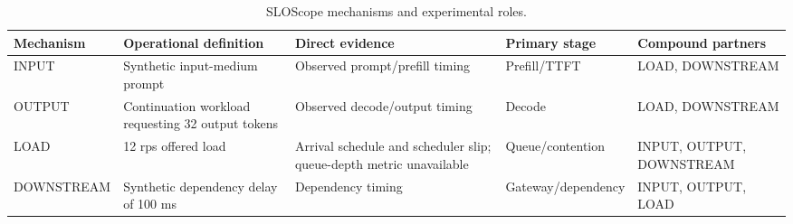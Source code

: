 \begin{table}[t]
\centering
\small
\caption{SLOScope mechanisms and experimental roles.}
\begin{tabular}{lllll}
\hline
Mechanism & Operational definition & Direct evidence & Primary stage & Compound partners \\
\hline
INPUT & Synthetic input-medium prompt & Observed prompt/prefill timing & Prefill/TTFT & LOAD, DOWNSTREAM \\
OUTPUT & Continuation workload requesting 32 output tokens & Observed decode/output timing & Decode & LOAD, DOWNSTREAM \\
LOAD & 12 rps offered load & Arrival schedule and scheduler slip; queue-depth metric unavailable & Queue/contention & INPUT, OUTPUT, DOWNSTREAM \\
DOWNSTREAM & Synthetic dependency delay of 100 ms & Dependency timing & Gateway/dependency & INPUT, OUTPUT, LOAD \\
\hline
\end{tabular}
\end{table}
